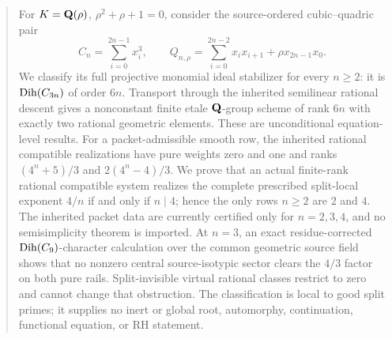 \begin{abstract}
For \(K=\Q(\rho)\), \(\rho^2+\rho+1=0\), consider the source-ordered
cubic--quadric pair
\[
C_n=\sum_{i=0}^{2n-1}x_i^3,\qquad
Q_{n,\rho}=\sum_{i=0}^{2n-2}x_ix_{i+1}
             +\rho x_{2n-1}x_0.
\]
We classify its full projective monomial ideal stabilizer for every
\(n\ge2\): it is \(\Dih(C_{3n})\) of order \(6n\).  Transport through
the inherited semilinear rational descent gives a nonconstant finite etale
\(\Q\)-group scheme of rank \(6n\) with exactly two rational geometric
elements.  These are unconditional equation-level results.  For a
packet-admissible smooth row, the inherited rational compatible realizations
have pure weights zero and one and ranks
\((4^n+5)/3\) and \(2(4^n-4)/3\).  We prove that an actual finite-rank
rational compatible system realizes the complete prescribed split-local
exponent \(4/n\) if and only if \(n\mid4\); hence the only rows
\(n\ge2\) are \(2\) and \(4\).  The inherited packet data are currently
certified only for \(n=2,3,4\), and no semisimplicity theorem is imported.
At \(n=3\), an exact residue-corrected
\(\Dih(C_9)\)-character calculation over the common geometric source field
shows that no nonzero central source-isotypic sector clears the \(4/3\)
factor on both pure rails.  Split-invisible virtual rational classes restrict
to zero and cannot change that obstruction.  The classification is local to
good split primes; it supplies no inert or global root, automorphy,
continuation, functional equation, or RH statement.
\end{abstract}
